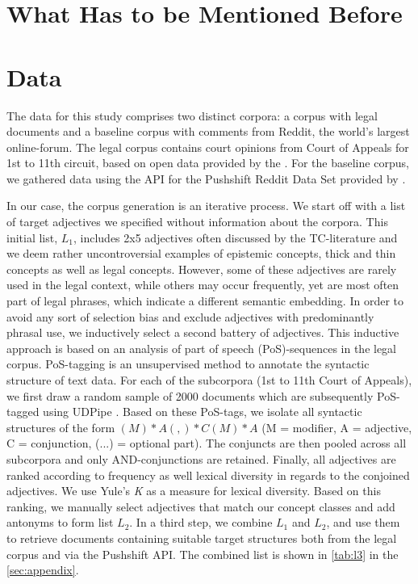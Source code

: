 \documentclass{article}
\begin{document}
\graphicspath{ {../../../output/03-results/plots/} }

\section{What Has to be Mentioned Before}
\label{sec:before}

\section{Data}

The data for this study comprises two distinct corpora: a corpus with legal documents and a baseline corpus with comments from Reddit, the world's largest online-forum. The legal corpus contains court opinions from Court of Appeals for 1st to 11th circuit, based on open data provided by the \citet{FreeLawProject2020}. For the baseline corpus, we gathered data using the API for the Pushshift Reddit Data Set provided by \citet{Baumgartner2020}. 

In our case, the corpus generation is an iterative process. We start off with a list of target adjectives we specified without information about the corpora. This initial list, $L_1$, includes 2x5 adjectives often discussed by the TC-literature and we deem rather uncontroversial examples of epistemic concepts, thick and thin concepts as well as legal concepts. However, some of these adjectives are rarely used in the legal context, while others may occur frequently, yet are most often part of legal phrases, which indicate a different semantic embedding. In order to avoid any sort of selection bias and exclude adjectives with predominantly phrasal use, we inductively select a second battery of adjectives. This inductive approach is based on an analysis of part of speech (PoS)-sequences in the legal corpus. PoS-tagging is an unsupervised method to annotate the syntactic structure of text data. For each of the subcorpora (1st to 11th Court of Appeals), we first draw a random sample of 2000 documents which are subsequently PoS-tagged using UDPipe \citep{Straka2017, Straka2020}. Based on these PoS-tags, we isolate all syntactic structures of the form $(M)*A(,)*C(M)*A$ (M = modifier, A = adjective, C = conjunction, (...) = optional part). The conjuncts are then pooled across all subcorpora and only AND-conjunctions are retained. Finally, all adjectives %
are ranked according to frequency as well lexical diversity in regards to the conjoined adjectives. We use Yule's \textit{K} \citep{Yule1944, Tweedie1998} as a measure for lexical diversity.  %
Based on this ranking, we manually select adjectives that match our concept classes and add antonyms to form list $L_2$. In a third step, we combine $L_1$ and $L_2$, and use them to retrieve documents containing suitable target structures both from the legal corpus and via the Pushshift API. The combined list is shown in \ref{tab:l3} in the \ref{sec:appendix}. 
\end{document}
